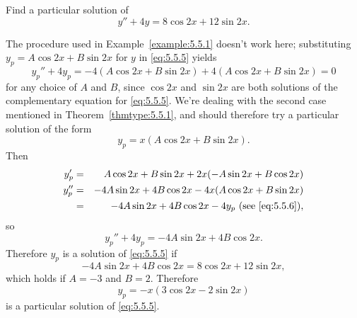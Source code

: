 \documentclass{ximera}
\begin{document}
\begin{example}\label{example:5.5.2}
Find a particular solution of
\begin{equation} \label{eq:5.5.5}
y''+4y=8\cos2x+12\sin2x.
\end{equation}


\begin{explanation}
The procedure used in  Example~\ref{example:5.5.1} doesn't work here;
substituting $y_p=A\cos2x+B\sin2x$ for $y$ in \eqref{eq:5.5.5} yields
$$
y_p''+4y_p=-4(A\cos2x+B\sin2x) +4(A\cos2x+B\sin2x)=0
$$
for any choice of $A$ and $B$, since $\cos2x$ and $\sin2x$ are both
solutions of the complementary equation for \eqref{eq:5.5.5}. We're
dealing with the second case mentioned in Theorem~\ref{thmtype:5.5.1}, and
should therefore try a particular solution of the form
\begin{equation} \label{eq:5.5.6}
y_p=x(A\cos2x+B\sin2x).
\end{equation}
Then
\begin{eqnarray*}
y_p'&=&A\cos2x+B\sin2x+2x(-A\sin2x+B\cos2x)
\\ 
y_p''&=&-4A\sin2x+4B\cos2x-4x(A\cos2x+B\sin2x)\\
&=&-4A\sin2x+4B\cos2x-4y_p \mbox{ (see \eqref{eq:5.5.6})},
\end{eqnarray*}
so
$$
y_p''+4y_p=-4A\sin2x+4B\cos2x.
$$
Therefore $y_p$ is a solution of \eqref{eq:5.5.5} if
$$
-4A\sin2x+4B\cos2x=8\cos2x+12\sin2x,
$$
which holds if $A=-3$ and $B=2$.  Therefore
$$
y_p=-x(3\cos2x-2\sin2x)
$$
is a particular solution of \eqref{eq:5.5.5}.
\end{explanation}
\end{example}
\end{document}
